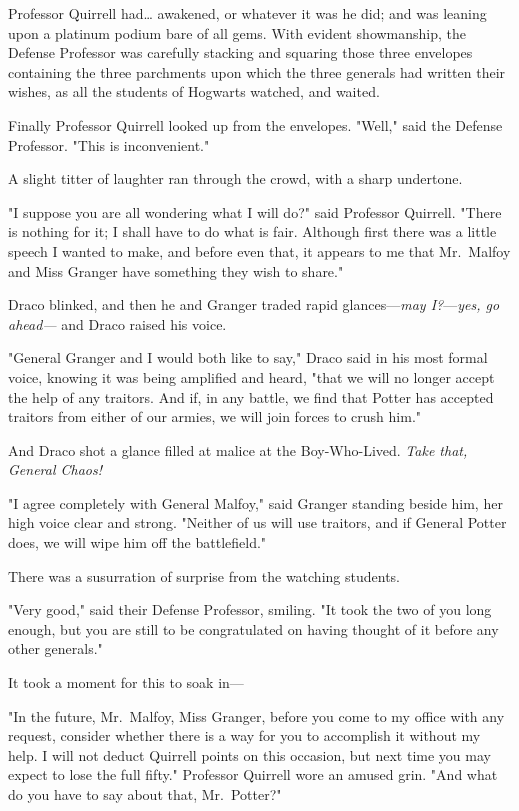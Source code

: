 Professor Quirrell had{\ldots} awakened, or whatever it was he did; and was 
leaning upon a platinum podium bare of all gems. With evident showmanship, the 
Defense Professor was carefully stacking and squaring those three envelopes 
containing the three parchments upon which the three generals had written their 
wishes, as all the students of Hogwarts watched, and waited.

Finally Professor Quirrell looked up from the envelopes. "Well," said the 
Defense Professor. "This is inconvenient."

A slight titter of laughter ran through the crowd, with a sharp undertone.

"I suppose you are all wondering what I will do?" said Professor Quirrell. 
"There is nothing for it; I shall have to do what is fair. Although first there 
was a little speech I wanted to make, and before even that, it appears to me 
that Mr.~Malfoy and Miss Granger have something they wish to share."

Draco blinked, and then he and Granger traded rapid glances---\emph{may 
I?}---\emph{yes, go ahead---} and Draco raised his voice.

"General Granger and I would both like to say," Draco said in his most formal 
voice, knowing it was being amplified and heard, "that we will no longer accept 
the help of any traitors. And if, in any battle, we find that Potter has 
accepted traitors from either of our armies, we will join forces to crush him."

And Draco shot a glance filled at malice at the Boy-Who-Lived. \emph{Take that, 
General Chaos!}

"I agree completely with General Malfoy," said Granger standing beside him, her 
high voice clear and strong. "Neither of us will use traitors, and if General 
Potter does, we will wipe him off the battlefield."

There was a susurration of surprise from the watching students.

"Very good," said their Defense Professor, smiling. "It took the two of you 
long enough, but you are still to be congratulated on having thought of it 
before any other generals."

It took a moment for this to soak in---

"In the future, Mr.~Malfoy, Miss Granger, before you come to my office with any 
request, consider whether there is a way for you to accomplish it without my 
help. I will not deduct Quirrell points on this occasion, but next time you may 
expect to lose the full fifty." Professor Quirrell wore an amused grin. "And 
what do you have to say about that, Mr.~Potter?"

